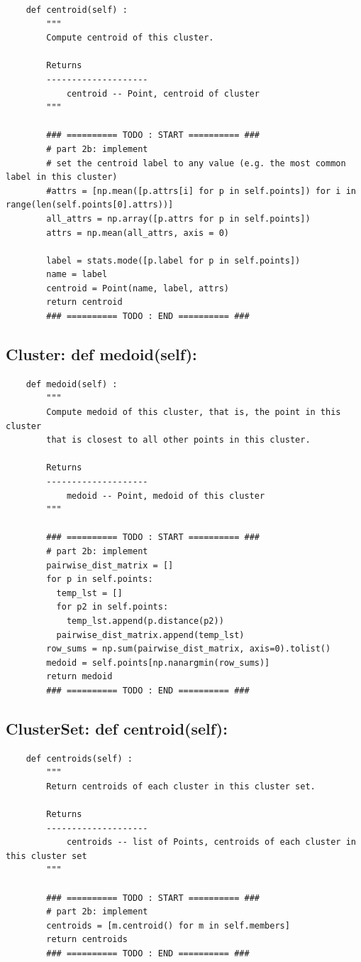 \documentclass[10pt]{article}
\begin{document}
\begin{verbatim}
    def centroid(self) :
        """
        Compute centroid of this cluster.

        Returns
        --------------------
            centroid -- Point, centroid of cluster
        """

        ### ========== TODO : START ========== ###
        # part 2b: implement
        # set the centroid label to any value (e.g. the most common label in this cluster)
        #attrs = [np.mean([p.attrs[i] for p in self.points]) for i in range(len(self.points[0].attrs))]
        all_attrs = np.array([p.attrs for p in self.points])
        attrs = np.mean(all_attrs, axis = 0)

        label = stats.mode([p.label for p in self.points])
        name = label
        centroid = Point(name, label, attrs)
        return centroid
        ### ========== TODO : END ========== ###
\end{verbatim} 

\subsection*{Cluster: def medoid(self):}

\begin{verbatim}
    def medoid(self) :
        """
        Compute medoid of this cluster, that is, the point in this cluster
        that is closest to all other points in this cluster.

        Returns
        --------------------
            medoid -- Point, medoid of this cluster
        """

        ### ========== TODO : START ========== ###
        # part 2b: implement
        pairwise_dist_matrix = []
        for p in self.points:
          temp_lst = []
          for p2 in self.points:
            temp_lst.append(p.distance(p2))
          pairwise_dist_matrix.append(temp_lst)
        row_sums = np.sum(pairwise_dist_matrix, axis=0).tolist()
        medoid = self.points[np.nanargmin(row_sums)]
        return medoid
        ### ========== TODO : END ========== ###
\end{verbatim}

\subsection*{ClusterSet: def centroid(self):}

\begin{verbatim}
    def centroids(self) :
        """
        Return centroids of each cluster in this cluster set.

        Returns
        --------------------
            centroids -- list of Points, centroids of each cluster in this cluster set
        """

        ### ========== TODO : START ========== ###
        # part 2b: implement
        centroids = [m.centroid() for m in self.members]
        return centroids
        ### ========== TODO : END ========== ###
\end{verbatim}
\end{document}
